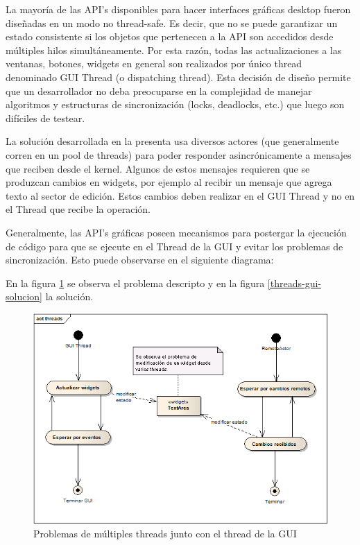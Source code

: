 \documentclass[12pt,a4paper]{article}
\begin{document}
La mayoría de las API’s disponibles para hacer interfaces gráficas desktop fueron diseñadas en un 
modo no thread-safe. Es decir, que no se puede garantizar un estado consistente si los objetos que pertenecen a la API son
accedidos desde múltiples hilos simultáneamente. Por esta razón, todas las actualizaciones a las ventanas, botones, widgets
en general son realizados por único thread denominado GUI Thread (o dispatching thread). Esta decisión de diseño permite que
un desarrollador no deba preocuparse en la complejidad de manejar algoritmos y estructuras de sincronización
(locks, deadlocks, etc.) que luego son difíciles de testear.

La solución desarrollada en la presenta usa diversos actores (que generalmente corren en un pool de threads) para poder 
responder asincrónicamente a mensajes que reciben desde el kernel. Algunos de estos mensajes requieren que se produzcan
cambios en widgets, por ejemplo al recibir un mensaje que agrega texto al sector de edición. Estos cambios deben realizar en
el GUI Thread y no en el Thread que recibe la operación.

Generalmente, las API’s gráficas poseen mecanismos para postergar la ejecución de código para que se ejecute en el Thread de
la GUI y evitar los problemas de sincronización. Esto puede observarse en el siguiente diagrama:

En la figura \ref{threads-gui} se observa el problema descripto y en la figura \ref{threads-gui-solucion} la solución.

	\begin{figure}[!ht]
		\begin{center}
			\includegraphics[width=14cm]{threads-gui.png}
			\caption{\label{threads-gui} Problemas de múltiples threads junto con el thread de la GUI }
		\end{center}
	\end{figure}
\end{document}
